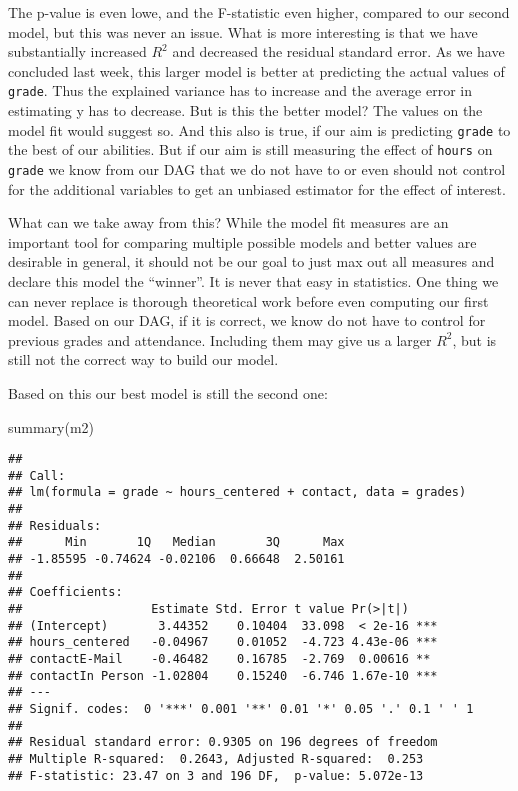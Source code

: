 \documentclass[
]{book}
\newenvironment{Shaded}{\begin{snugshade}}{\end{snugshade}}
\newcommand{\FunctionTok}[1]{\textcolor[rgb]{0.00,0.00,0.00}{#1}}
\newcommand{\FunctionTok}[1]{\textcolor[rgb]{0.13,0.29,0.53}{\textbf{#1}}}
\newcommand{\NormalTok}[1]{#1}
\begin{document}
The p-value is even lowe, and the F-statistic even higher, compared to our
second model, but this was never an issue. What is more interesting is that we
have substantially increased \(R^2\) and decreased the residual standard error.
As we have concluded last week, this larger model is better at predicting the
actual values of \texttt{grade}. Thus the explained variance has to increase and the
average error in estimating y has to decrease. But is this the better model? The
values on the model fit would suggest so. And this also is true, if our aim is
predicting \texttt{grade} to the best of our abilities. But if our aim is still
measuring the effect of \texttt{hours} on \texttt{grade} we know from our DAG that we do not
have to or even should not control for the additional variables to get an
unbiased estimator for the effect of interest.

What can we take away from this? While the model fit measures are an important
tool for comparing multiple possible models and better values are desirable in
general, it should not be our goal to just max out all measures and declare this
model the ``winner''. It is never that easy in statistics.
One thing we can never replace is thorough theoretical work before even
computing our first model. Based on our DAG, if it is correct, we know do not
have to control for previous grades and attendance. Including them may give us a
larger \(R^2\), but is still not the correct way to build our model.

Based on this our best model is still the second one:

\begin{Shaded}
\begin{Highlighting}[]
\FunctionTok{summary}\NormalTok{(m2)}
\end{Highlighting}
\end{Shaded}

\begin{verbatim}
## 
## Call:
## lm(formula = grade ~ hours_centered + contact, data = grades)
## 
## Residuals:
##      Min       1Q   Median       3Q      Max 
## -1.85595 -0.74624 -0.02106  0.66648  2.50161 
## 
## Coefficients:
##                  Estimate Std. Error t value Pr(>|t|)    
## (Intercept)       3.44352    0.10404  33.098  < 2e-16 ***
## hours_centered   -0.04967    0.01052  -4.723 4.43e-06 ***
## contactE-Mail    -0.46482    0.16785  -2.769  0.00616 ** 
## contactIn Person -1.02804    0.15240  -6.746 1.67e-10 ***
## ---
## Signif. codes:  0 '***' 0.001 '**' 0.01 '*' 0.05 '.' 0.1 ' ' 1
## 
## Residual standard error: 0.9305 on 196 degrees of freedom
## Multiple R-squared:  0.2643, Adjusted R-squared:  0.253 
## F-statistic: 23.47 on 3 and 196 DF,  p-value: 5.072e-13
\end{verbatim}
\end{document}
